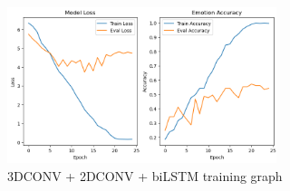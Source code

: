 \documentclass{article}
\begin{document}
\begin{figure}[H]
  \begin{center}
    \includegraphics*[width=0.7\textwidth]{Figures/Picture12.png}
  \end{center}
  \caption{3DCONV + 2DCONV + biLSTM training graph}
  \label{fig:fig12}
\end{figure}
\end{document}
